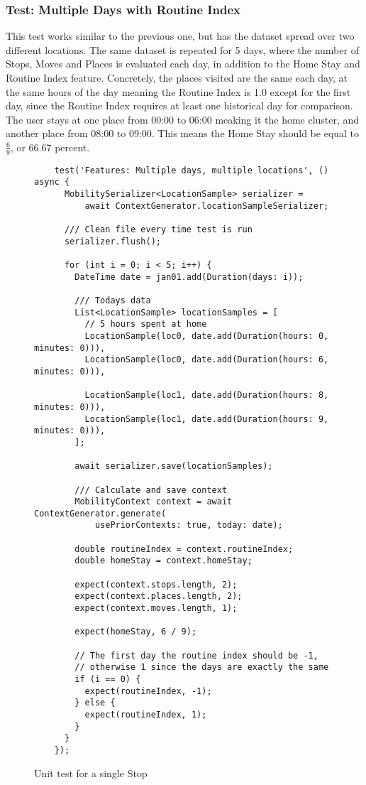 \subsubsection*{Test: Multiple Days with Routine Index}
This test works similar to the previous one, but has the dataset spread over two different locations. The same dataset is repeated for 5 days, where the number of Stops, Moves and Places is evaluated each day, in addition to the Home Stay and Routine Index feature. Concretely, the places visited are the same each day, at the same hours of the day meaning the Routine Index is 1.0 except for the first day, since the Routine Index requires at least one historical day for comparison. The user stays at one place from 00:00 to 06:00 meaking it the home cluster, and another place from 08:00 to 09:00. This means the Home Stay should be equal to $\frac{6}{9}$, or 66.67 percent. 


\begin{figure}
    \centering
    \begin{verbatim}
    test('Features: Multiple days, multiple locations', () async {
      MobilitySerializer<LocationSample> serializer =
          await ContextGenerator.locationSampleSerializer;

      /// Clean file every time test is run
      serializer.flush();

      for (int i = 0; i < 5; i++) {
        DateTime date = jan01.add(Duration(days: i));

        /// Todays data
        List<LocationSample> locationSamples = [
          // 5 hours spent at home
          LocationSample(loc0, date.add(Duration(hours: 0, minutes: 0))),
          LocationSample(loc0, date.add(Duration(hours: 6, minutes: 0))),

          LocationSample(loc1, date.add(Duration(hours: 8, minutes: 0))),
          LocationSample(loc1, date.add(Duration(hours: 9, minutes: 0))),
        ];

        await serializer.save(locationSamples);

        /// Calculate and save context
        MobilityContext context = await ContextGenerator.generate(
            usePriorContexts: true, today: date);

        double routineIndex = context.routineIndex;
        double homeStay = context.homeStay;

        expect(context.stops.length, 2);
        expect(context.places.length, 2);
        expect(context.moves.length, 1);

        expect(homeStay, 6 / 9);

        // The first day the routine index should be -1,
        // otherwise 1 since the days are exactly the same
        if (i == 0) {
          expect(routineIndex, -1);
        } else {
          expect(routineIndex, 1);
        }
      }
    });
    \end{verbatim}
    \caption{Unit test for a single Stop}
    \label{fig:test-single-stop}
\end{figure}